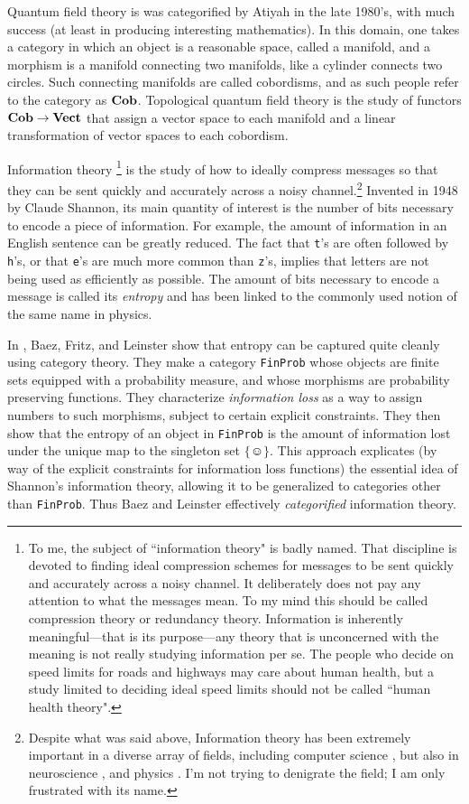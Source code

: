 \documentclass{book}
\def\singleton{\{\smiley\}}
\def\to{\rightarrow}
\def\Vect{{\bf Vect}}
\def\Cob{{\bf Cob}}
\theoremstyle{remark}
\theoremstyle{definition}
\begin{document}
Quantum field theory is was categorified by Atiyah \cite{Ati} in the late 1980's, with much success (at least in producing interesting mathematics). In this domain, one takes a category in which an object is a reasonable space, called a manifold, and a morphism is a manifold connecting two manifolds, like a cylinder connects two circles. Such connecting manifolds are called cobordisms, and as such people refer to the category as $\Cob$. Topological quantum field theory is the study of functors $\Cob\to\Vect$ that assign a vector space to each manifold and a linear transformation of vector spaces to each cobordism. 

Information theory 
\footnote{To me, the subject of ``information theory" is badly named. That discipline is devoted to finding ideal compression schemes for messages to be sent quickly and accurately across a noisy channel. It deliberately does not pay any attention to what the messages mean. To my mind this should be called compression theory or redundancy theory. Information is inherently meaningful---that is its purpose---any theory that is unconcerned with the meaning is not really studying information per se. The people who decide on speed limits for roads and highways may care about human health, but a study limited to deciding ideal speed limits should not be called ``human health theory".} 
is the study of how to ideally compress messages so that they can be sent quickly and accurately across a noisy channel.\footnote{Despite what was said above, Information theory has been extremely important in a diverse array of fields, including computer science \cite{MacK}, but also in neuroscience \cite{Bar}, \cite{Lin} and physics \cite{Eve}. I'm not trying to denigrate the field; I am only frustrated with its name.} Invented in 1948 by Claude Shannon, its main quantity of interest is the number of bits necessary to encode a piece of information. For example, the amount of information in an English sentence can be greatly reduced. The fact that {\tt t}'s are often followed by {\tt h}'s, or that {\tt e}'s are much more common than {\tt z}'s, implies that letters are not being used as efficiently as possible. The amount of bits necessary to encode a message is called its {\em entropy} and has been linked to the commonly used notion of the same name in physics. 

In \cite{BFL}, Baez, Fritz, and Leinster show that entropy can be captured quite cleanly using category theory. They make a category {\tt FinProb} whose objects are finite sets equipped with a probability measure, and whose morphisms are probability preserving functions. They characterize {\em information loss} as a way to assign numbers to such morphisms, subject to certain explicit constraints. They then show that the entropy of an object in {\tt FinProb} is the amount of information lost under the unique map to the singleton set $\singleton$. This approach explicates (by way of the explicit constraints for information loss functions) the essential idea of Shannon's information theory, allowing it to be generalized to categories other than {\tt FinProb}. Thus Baez and Leinster effectively {\em categorified} information theory.
\end{document}
